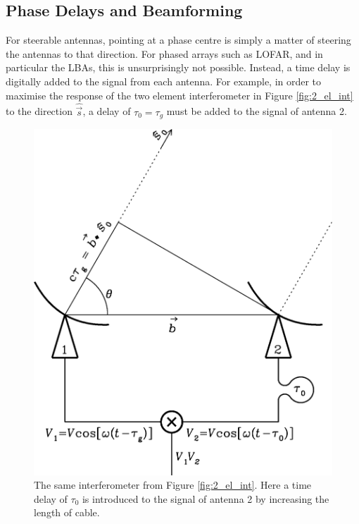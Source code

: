 \subsection{Phase Delays and Beamforming}
\label{sec:beamform_theory}
For steerable antennas, pointing at a phase centre is simply a matter of steering the antennas to that direction. For phased arrays such as LOFAR, and in particular the LBAs, this is unsurprisingly not possible. Instead, a time delay is digitally added to the signal from each antenna. For example, in order to maximise the response of the two element interferometer in Figure \ref{fig:2_el_int} to the direction $\hat{\Vec{s}}$, a delay of $\tau_0 = \tau_g$ must be added to the signal of antenna 2. 

\begin{figure}[ht]
    \centering
    \includegraphics[width=0.75\columnwidth]{Images/2_elem_int_delay.png}
    \caption[A two element interferometer with a time delay added to one signa.]{The same interferometer from Figure \ref{fig:2_el_int}. Here a time delay of $\tau_0$ is introduced to the signal of antenna 2 by increasing the length of cable.}
    \label{fig:2_el_int_delay}
\end{figure}

